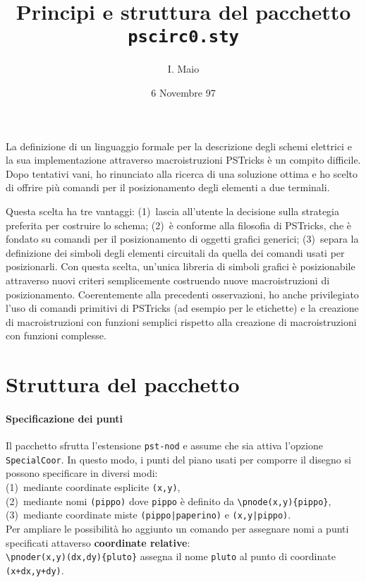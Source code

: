 \documentclass[12pt,a4paper]{articolo}
\title{\bfseries\vspace*{-1.5cm}
Principi e struttura del pacchetto \texttt{pscirc0.sty}}
\author{I. Maio}
\date{6 Novembre 97}
\begin{document}
\maketitle

La definizione di un linguaggio formale per la descrizione degli schemi elettrici e la sua implementazione attraverso macroistruzioni PSTricks \`e un compito difficile.
Dopo tentativi vani, ho rinunciato alla ricerca di una soluzione ottima e ho scelto di offrire pi\`u comandi per il posizionamento degli elementi a due terminali.

Questa scelta ha tre vantaggi:
(1)~lascia all'utente la decisione sulla strategia preferita per costruire lo schema;
(2)~\`e conforme alla filosofia di PSTricks, che \`e fondato su comandi per il posizionamento di oggetti grafici generici;
(3)~separa la definizione dei simboli degli elementi circuitali da quella dei comandi usati per posizionarli.
Con questa scelta, un'unica libreria di simboli grafici \`e posizionabile attraverso nuovi criteri semplicemente costruendo nuove macroistruzioni di posizionamento.
Coerentemente alla precedenti osservazioni, ho anche privilegiato l'uso  di comandi primitivi di PSTricks (ad esempio per le etichette) e la creazione di macroistruzioni con funzioni semplici rispetto alla creazione di macroistruzioni con funzioni complesse. 

\section{Struttura del pacchetto}

\paragraph{Specificazione dei punti}
Il pacchetto sfrutta l'estensione \texttt{pst-nod} e assume che sia attiva l'opzione \texttt{SpecialCoor}.
In questo modo, i punti del piano usati per comporre il disegno si possono specificare in diversi modi:\\
(1)~mediante coordinate esplicite \texttt{(x,y)},\\
(2)~mediante nomi \texttt{(pippo)} dove \texttt{pippo} \`e definito da \verb"\pnode(x,y){pippo}",\\
(3)~mediante coordinate miste \texttt{(pippo|paperino)} e \texttt{(x,y|pippo)}.\\
Per ampliare le possibilit\`a ho aggiunto un comando per assegnare nomi a punti specificati attaverso \textbf{coordinate relative}:\\
\verb"\pnoder(x,y)(dx,dy){pluto}" assegna il nome \texttt{pluto} al punto di coordinate \verb"(x+dx,y+dy)".
\end{document}
